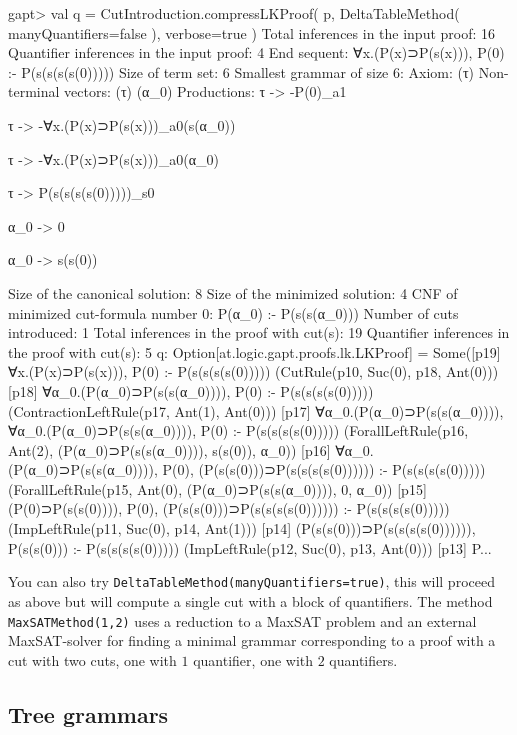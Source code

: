 \documentclass[a4paper,11pt]{article}
\begin{document}
\begin{clilisting}
gapt> val q = CutIntroduction.compressLKProof( p,                                   DeltaTableMethod( manyQuantifiers=false ), verbose=true )
Total inferences in the input proof: 16
Quantifier inferences in the input proof: 4
End sequent: ∀x.(P(x)⊃P(s(x))), P(0) :- P(s(s(s(s(0)))))
Size of term set: 6
Smallest grammar of size 6:
Axiom: (τ)
Non-terminal vectors:
  (τ)
  (α_0)
Productions:
  τ -> -{P(0)}_a1

  τ -> -{∀x.(P(x)⊃P(s(x)))}_a0(s(α_0))

  τ -> -{∀x.(P(x)⊃P(s(x)))}_a0(α_0)

  τ -> {P(s(s(s(s(0)))))}_s0

  α_0 -> 0

  α_0 -> s(s(0))


Size of the canonical solution: 8
Size of the minimized solution: 4
CNF of minimized cut-formula number 0:
  P(α_0) :- P(s(s(α_0)))
Number of cuts introduced: 1
Total inferences in the proof with cut(s): 19
Quantifier inferences in the proof with cut(s): 5
q: Option[at.logic.gapt.proofs.lk.LKProof] =
Some([p19] ∀x.(P(x)⊃P(s(x))), P(0) :- P(s(s(s(s(0)))))    (CutRule(p10, Suc(0), p18, Ant(0)))
[p18] ∀α_0.(P(α_0)⊃P(s(s(α_0)))), P(0) :- P(s(s(s(s(0)))))    (ContractionLeftRule(p17, Ant(1), Ant(0)))
[p17] ∀α_0.(P(α_0)⊃P(s(s(α_0)))), ∀α_0.(P(α_0)⊃P(s(s(α_0)))), P(0) :- P(s(s(s(s(0)))))    (ForallLeftRule(p16, Ant(2), (P(α_0)⊃P(s(s(α_0)))), s(s(0)), α_0))
[p16] ∀α_0.(P(α_0)⊃P(s(s(α_0)))), P(0), (P(s(s(0)))⊃P(s(s(s(s(0)))))) :- P(s(s(s(s(0)))))    (ForallLeftRule(p15, Ant(0), (P(α_0)⊃P(s(s(α_0)))), 0, α_0))
[p15] (P(0)⊃P(s(s(0)))), P(0), (P(s(s(0)))⊃P(s(s(s(s(0)))))) :- P(s(s(s(s(0)))))    (ImpLeftRule(p11, Suc(0), p14, Ant(1)))
[p14] (P(s(s(0)))⊃P(s(s(s(s(0)))))), P(s(s(0))) :- P(s(s(s(s(0)))))    (ImpLeftRule(p12, Suc(0), p13, Ant(0)))
[p13] P...
\end{clilisting}
You can also try \texttt{DeltaTableMethod(manyQuantifiers=true)}, this will proceed as above but will
compute a single cut with a block of quantifiers.  The method \texttt{MaxSATMethod(1,2)}
uses a reduction to a MaxSAT problem and an external MaxSAT-solver for finding a
minimal grammar corresponding to a proof with a cut with two cuts, one with $1$
quantifier, one with $2$ quantifiers.

\subsection{Tree grammars}
\end{document}
